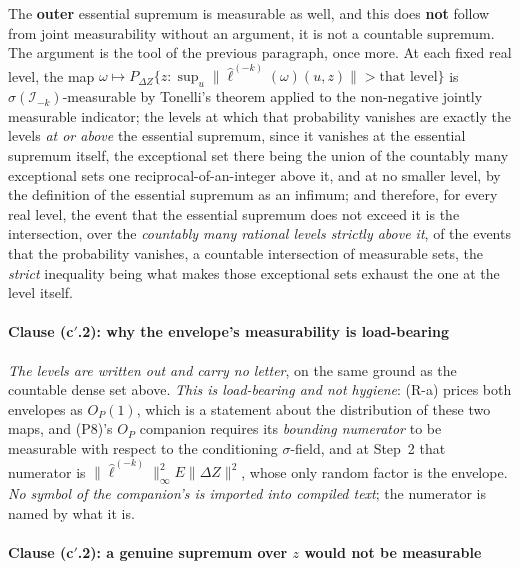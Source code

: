 The \textbf{outer} essential supremum is measurable as well, and this does \textbf{not} follow from
joint measurability without an argument, it is not a countable supremum. The argument is the
tool of the previous
paragraph, once more. At each fixed real level, the map
$\omega\mapsto P_{\Delta Z}\big\{z:\sup_u\|\hat\ell^{(-k)}(\omega)(u,z)\|>\text{that level}\big\}$ is
$\sigma(\mathcal I_{-k})$-measurable by Tonelli's theorem applied to the non-negative jointly measurable
indicator; the levels at which that probability vanishes are exactly the levels \emph{at or above} the
essential supremum, since it vanishes at the essential supremum itself, the exceptional set there being
the union of the countably many exceptional sets one reciprocal-of-an-integer above it, and at no
smaller level, by the definition of the essential supremum as an infimum; and therefore, for every real
level, the event that the essential supremum does not exceed it is the intersection, over the
\emph{countably many rational levels strictly above it}, of the events that the probability vanishes, 
a countable intersection of measurable sets, the \emph{strict} inequality being what makes those
exceptional sets exhaust the one at the level itself.

\paragraph{Clause \textup{(c$'$.2)}: why the envelope's measurability is load-bearing}

\emph{The levels are written out and carry no letter}, on the same ground as the countable
dense set above. \emph{This is load-bearing and not hygiene}: (R-a) prices both envelopes as
$O_P(1)$, which is a statement about the distribution of these two maps, and \textup{(P8)}'s $O_P$
companion requires its \emph{bounding numerator} to be measurable with respect to the conditioning
$\sigma$-field, and at  Step~2 that numerator is
$\|\hat\ell^{(-k)}\|^{2}_\infty E\|\Delta Z\|^{2}$, whose only random factor is the envelope. \emph{No
symbol of the companion's is imported into compiled text}; the numerator is named by what it is.

\paragraph{Clause \textup{(c$'$.2)}: a genuine supremum over $z$ would not be measurable}

